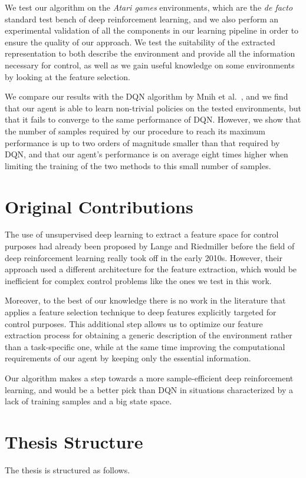 We test our algorithm on the \textit{Atari games} environments, which are
the \textit{de facto} standard test bench of deep reinforcement learning, and we 
also perform an experimental validation of all the components in our learning 
pipeline in order to ensure the quality of our approach.
We test the suitability of the extracted representation to both describe the 
environment and provide all the information necessary for control, as well as 
we gain useful knowledge on some environments by looking at the feature 
selection.

We compare our results with the DQN algorithm by Mnih et al.\ \cite{mnih2015human},
and we find that our agent is able to learn non-trivial policies on the tested 
environments, but that it fails to converge to the same performance of DQN. 
However, we show that the number of samples required by our procedure to reach 
its maximum performance is up to two orders of magnitude smaller than that 
required by DQN, and that our agent's performance is on average eight times 
higher when limiting the training of the two methods to this small number of 
samples.

\section{Original Contributions}
The use of unsupervised deep learning to extract a feature space for control 
purposes had already been proposed by Lange and Riedmiller \cite{lange2010deep} 
before the field of deep reinforcement learning really took off in the early 
2010s. 
However, their approach used a different architecture for the feature extraction, 
which would be inefficient for complex control problems like the ones we test
in this work. 

Moreover, to the best of our knowledge there is no work in the literature that
applies a feature selection technique to deep features explicitly targeted 
for control purposes. 
This additional step allows us to optimize our feature extraction process for 
obtaining a generic description of the environment rather than a task-specific 
one, while at the same time improving the computational requirements of our 
agent by keeping only the essential information. 

Our algorithm makes a step towards a more sample-efficient deep reinforcement 
learning, and would be a better pick than DQN in situations characterized by a 
lack of training samples and a big state space. 

\section{Thesis Structure}
The thesis is structured as follows. 


